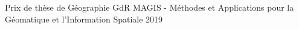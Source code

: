 
\begin{cvhonors}

  \cvhonor
    {Prix de thèse de Géographie} %
    {GdR MAGIS - Méthodes et Applications pour la Géomatique et l'Information Spatiale} %
    {} %
    {2019} %

\end{cvhonors}

